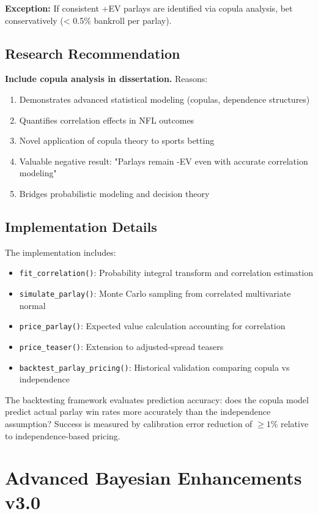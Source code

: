 \textbf{Exception:} If consistent +EV parlays are identified via copula analysis, bet conservatively (< 0.5\% bankroll per parlay).

\subsection{Research Recommendation}
\textbf{Include copula analysis in dissertation.} Reasons:
\begin{enumerate}
  \item Demonstrates advanced statistical modeling (copulas, dependence structures)
  \item Quantifies correlation effects in NFL outcomes
  \item Novel application of copula theory to sports betting
  \item Valuable negative result: "Parlays remain -EV even with accurate correlation modeling"
  \item Bridges probabilistic modeling and decision theory
\end{enumerate}

\subsection{Implementation Details}
The implementation includes:
\begin{itemize}
  \item \texttt{fit\_correlation()}: Probability integral transform and correlation estimation
  \item \texttt{simulate\_parlay()}: Monte Carlo sampling from correlated multivariate normal
  \item \texttt{price\_parlay()}: Expected value calculation accounting for correlation
  \item \texttt{price\_teaser()}: Extension to adjusted-spread teasers
  \item \texttt{backtest\_parlay\_pricing()}: Historical validation comparing copula vs independence
\end{itemize}

The backtesting framework evaluates prediction accuracy: does the copula model predict actual parlay win rates more accurately than the independence assumption? Success is measured by calibration error reduction of $\geq 1\%$ relative to independence-based pricing.

\section{Advanced Bayesian Enhancements v3.0}\label{app:bayesian-v3}

